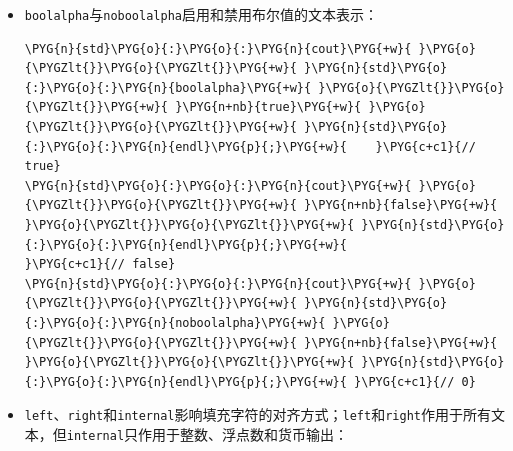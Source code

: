 
\begin{itemize}
\item \texttt{boolalpha}与\texttt{noboolalpha}启用和禁用布尔值的文本表示：



\begin{codeblockbg}
\begin{Verbatim}[commandchars=\\\{\},breaklines=true,breakanywhere=true,fontsize=\codefont,xleftmargin=17bp]
\PYG{n}{std}\PYG{o}{:}\PYG{o}{:}\PYG{n}{cout}\PYG{+w}{ }\PYG{o}{\PYGZlt{}}\PYG{o}{\PYGZlt{}}\PYG{+w}{ }\PYG{n}{std}\PYG{o}{:}\PYG{o}{:}\PYG{n}{boolalpha}\PYG{+w}{ }\PYG{o}{\PYGZlt{}}\PYG{o}{\PYGZlt{}}\PYG{+w}{ }\PYG{n+nb}{true}\PYG{+w}{ }\PYG{o}{\PYGZlt{}}\PYG{o}{\PYGZlt{}}\PYG{+w}{ }\PYG{n}{std}\PYG{o}{:}\PYG{o}{:}\PYG{n}{endl}\PYG{p}{;}\PYG{+w}{    }\PYG{c+c1}{// true}
\PYG{n}{std}\PYG{o}{:}\PYG{o}{:}\PYG{n}{cout}\PYG{+w}{ }\PYG{o}{\PYGZlt{}}\PYG{o}{\PYGZlt{}}\PYG{+w}{ }\PYG{n+nb}{false}\PYG{+w}{ }\PYG{o}{\PYGZlt{}}\PYG{o}{\PYGZlt{}}\PYG{+w}{ }\PYG{n}{std}\PYG{o}{:}\PYG{o}{:}\PYG{n}{endl}\PYG{p}{;}\PYG{+w}{                     }\PYG{c+c1}{// false}
\PYG{n}{std}\PYG{o}{:}\PYG{o}{:}\PYG{n}{cout}\PYG{+w}{ }\PYG{o}{\PYGZlt{}}\PYG{o}{\PYGZlt{}}\PYG{+w}{ }\PYG{n}{std}\PYG{o}{:}\PYG{o}{:}\PYG{n}{noboolalpha}\PYG{+w}{ }\PYG{o}{\PYGZlt{}}\PYG{o}{\PYGZlt{}}\PYG{+w}{ }\PYG{n+nb}{false}\PYG{+w}{ }\PYG{o}{\PYGZlt{}}\PYG{o}{\PYGZlt{}}\PYG{+w}{ }\PYG{n}{std}\PYG{o}{:}\PYG{o}{:}\PYG{n}{endl}\PYG{p}{;}\PYG{+w}{ }\PYG{c+c1}{// 0}
\end{Verbatim}
\end{codeblockbg}


\item \texttt{left}、\texttt{right}和\texttt{internal}影响填充字符的对齐方式；\texttt{left}和\texttt{right}作用于所有文本，但\texttt{internal}只作用于整数、浮点数和货币输出：




\end{itemize}
